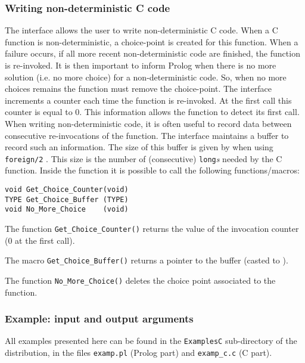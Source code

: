 \subsubsection{Writing non-deterministic C code}
\label{Writing-non-deterministic-C-code}
The interface allows the user to write non-deterministic C code. When a C
function is non-deterministic, a choice-point is created for this function.
When a failure occurs, if all more recent non-deterministic code are
finished, the function is re-invoked. It is then important to inform Prolog
when there is no more solution (i.e. no more choice) for a non-deterministic
code. So, when no more choices remains the function must remove the
choice-point. The interface increments a counter each time the function is
re-invoked. At the first call this counter is equal to 0. This information
allows the function to detect its first call. When writing non-deterministic
code, it is often useful to record data between consecutive re-invocations
of the function. The interface maintains a buffer to record such an
information. The size of this buffer is given by
 when using \texttt{foreign/2}
. This size is the number of (consecutive)
\texttt{long}\emph{s} needed by the C function. Inside the function it is
possible to call the following functions/macros:

\begin{Indentation}
\begin{verbatim}
void Get_Choice_Counter(void)
TYPE Get_Choice_Buffer (TYPE)
void No_More_Choice    (void)
\end{verbatim}
\end{Indentation}

The function \texttt{Get\_Choice\_Counter()} returns the value of the
invocation counter (0 at the first call).

The macro \texttt{Get\_Choice\_Buffer()} returns a
pointer to the buffer (casted to ).

The function \texttt{No\_More\_Choice()} deletes the choice point
associated to the function.

\subsubsection{Example: input and output arguments}
All examples presented here can be found in the \texttt{ExamplesC}
sub-directory of the distribution, in the files \texttt{examp.pl} (Prolog
part) and \texttt{examp\_c.c} (C part).

